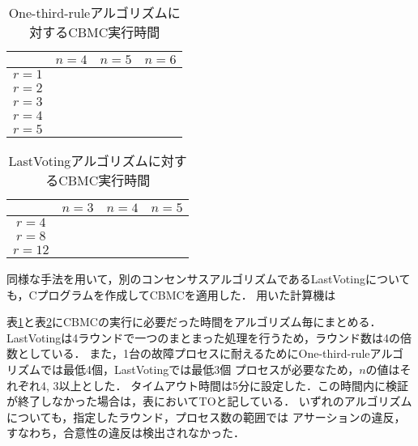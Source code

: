 \documentclass[technicalreport]{ieicej}
\theoremstyle{plain}
\begin{document}
\begin{table}[t]
    \centering
    \caption{One-third-ruleアルゴリズムに対するCBMC実行時間}\label{tab:onethird}
    \begin{tabular}{cccc}
        \hline
                &  $n=4$ & $n = 5$ & $n = 6$ \\ \hline
       $r = 1$ &    &    &     \\ 
       $r = 2$ &    &    &     \\ 
       $r = 3$ &    &    &     \\ 
       $r = 4$ &    &    &     \\ 
       $r = 5$ &    &    &     \\ 
       
       \hline

    \end{tabular}
\end{table}
\begin{table}[t]
    \centering
    \caption{LastVotingアルゴリズムに対するCBMC実行時間}\label{tab:lastvoting}
    \begin{tabular}{cccc}
        \hline
        &  $n=3$ & $n = 4$ & $n = 5$ \\ \hline
        $r = 4$ &    &    &     \\ 
        $r = 8$ &    &    &     \\ 
        $r = 12$ &    &    &     \\ 
        
        \hline
        
    \end{tabular}
\end{table}
%

同様な手法を用いて，別のコンセンサスアルゴリズムであるLastVoting\cite{HOjournal}についても，Cプログラムを作成してCBMCを適用した．
用いた計算機は

表\ref{tab:onethird}と表\ref{tab:lastvoting}にCBMCの実行に必要だった時間をアルゴリズム毎にまとめる．
LastVotingは4ラウンドで一つのまとまった処理を行うため，ラウンド数は4の倍数としている．
また，1台の故障プロセスに耐えるためにOne-third-ruleアルゴリズムでは最低4個，LastVotingでは最低3個
プロセスが必要なため，$n$の値はそれぞれ4, 3以上とした．
タイムアウト時間は5分に設定した．この時間内に検証が終了しなかった場合は，表においてTOと記している．
いずれのアルゴリズムについても，指定したラウンド，プロセス数の範囲では
アサーションの違反，すなわち，合意性の違反は検出されなかった．
\end{document}
